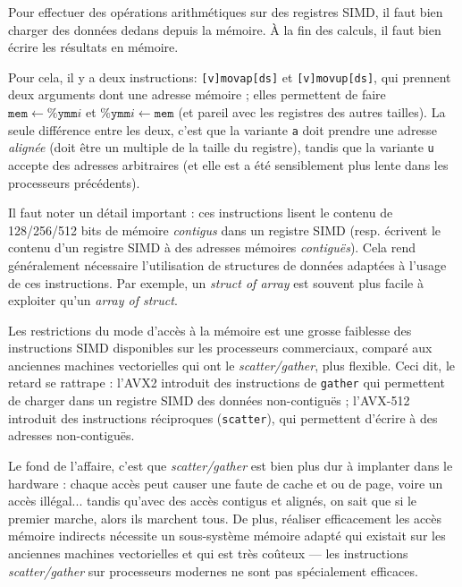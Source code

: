 Pour effectuer des opérations arithmétiques sur des registres SIMD, il faut bien
charger des données dedans depuis la mémoire. À la fin des calculs, il faut bien
écrire les résultats en mémoire.

Pour cela, il y a deux instructions: \texttt{[v]movap[ds]} et
\texttt{[v]movup[ds]}, qui prennent deux arguments dont une adresse mémoire ;
elles permettent de faire $\texttt{mem} \gets \texttt{\%ymm}i$ et
$\texttt{\%ymm}i \gets \texttt{mem}$ (et pareil avec les registres des autres
tailles). La seule différence entre les deux, c'est que la variante \texttt{a}
doit prendre une adresse \emph{alignée} (doit être un multiple de la taille du
registre), tandis que la variante \texttt{u} accepte des adresses arbitraires
(et elle est a été sensiblement plus lente dans les processeurs précédents).

Il faut noter un détail important : ces instructions lisent le contenu de
128/256/512 bits de mémoire \emph{contigus} dans un registre SIMD
(resp. écrivent le contenu d'un registre SIMD à des adresses mémoires
\emph{contiguës}). Cela rend généralement nécessaire l'utilisation de structures
de données adaptées à l'usage de ces instructions. Par exemple, un \emph{struct
  of array} est souvent plus facile à exploiter qu'un \emph{array of struct}.

Les restrictions du mode d'accès à la mémoire est une grosse faiblesse des
instructions SIMD disponibles sur les processeurs commerciaux, comparé aux
anciennes machines vectorielles qui ont le \emph{scatter/gather}, plus
flexible. Ceci dit, le retard se rattrape : l'AVX2 introduit des instructions de
\texttt{gather} qui permettent de charger dans un registre SIMD des données
non-contiguës ; l'AVX-512 introduit des instructions réciproques
(\texttt{scatter}), qui permettent d'écrire à des adresses non-contiguës.

\begin{danger}
  Le fond de l'affaire, c'est que \emph{scatter/gather} est bien plus dur à
  implanter dans le hardware : chaque accès peut causer une faute de cache et ou
  de page, voire un accès illégal... tandis qu'avec des accès contigus et
  alignés, on sait que si le premier marche, alors ils marchent tous. De plus,
  réaliser efficacement les accès mémoire indirects nécessite un sous-système mémoire
  adapté qui existait sur les anciennes machines vectorielles et qui est très
  coûteux --- les instructions \emph{scatter/gather} sur processeurs modernes ne
  sont pas spécialement efficaces.
\end{danger}

